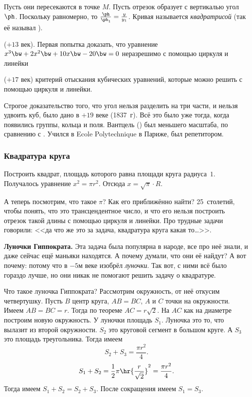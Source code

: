 \documentclass[a4paper,oneside,fleqn,10pt]{article}
\begin{document}


Пусть они пересекаются в точке $M$.  Пусть отрезок образует с
вертикалью угол $\ph$.  Поскольку равномерно, то $\frac{\ph}{\ph_1} =
\frac{y}{y_1}$.  Кривая называется \emph{квадратрисой} (так её называл
).

 ($+13$ век). Первая попытка доказать, что
уравнение $x^3 \bw+ 2x^2 \bw+ 10x \bw- 20 \bw= 0$ неразрешимо с
помощью циркуля и линейки 

 ($+17$ век) критерий отыскания кубических уравнений,
которые можно решить с помощью циркуля и линейки.

Строгое доказательство того, что угол нельзя разделить на три части, и
нельзя удвоить куб, было дано 
в $+19$ веке (1837~г).  Всё это было уже тогда, когда появились
группы, кольца и поля. Вантцель () был меньшего
масштаба, по сравнению с .  Учился в Ecole
Polytechnique в Париже, был репетитором.

\subsubsection{Квадратура круга}

Построить квадрат, площадь которого равна площади круга радиуса~$1$.
Получалось уравнение $x^2 = \pi r^2$. Отсюда $x = \sqrt\pi \cdot R$.

А теперь посмотрим, что такое $\pi$?  Как его приближённо найти?
25~столетий, чтобы понять, что это трансцендентное число, и что его
нельзя построить отрезок такой длины с помощью циркуля и линейки.  Про
трудные задачи говорили: <<да что же это за задача, квадратура круга
какая то\ldots>>.


\textbf{Луночки Гиппократа.}  Эта задача была популярна в народе, все
про неё знали, и даже сейчас ещё маньяки находятся.  А почему думали,
что они её найдут? А вот почему: потому что 
в $-5$м веке изобрёл \emph{луночки}.  Так вот, с ними всё было гораздо
лучше, но они никак не помогают решить задачу о квадратуре.

Что такое луночка Гиппократа? Рассмотрим окружность, от неё откусим
четвертушку.  Пусть $B$ центр круга, $AB= BC$, $A$ и $C$ точки на
окружности.  Имеем $AB = BC = r$. Тогда по теореме
 $AC = r\sqrt2$.  На $AC$ как на диаметре
построим новую окружность. У луночки площадь $S_1$.  Луночка это то,
что вылазит из второй окружности. $S_2$ это круговой сегмент в большом
круге. А $S_3$ это площадь треугольника. Тогда имеем
$$S_2 + S_3 = \frac{\pi r^2}{4}.$$ 
$$S_1 + S_2 = \frac12 \pi \hr{\frac{r}{\sqrt2}}^2 = \frac{\pi
  r^2}{4}.$$ Тогда имеем $S_1 + S_2 = S_2 + S_3$. После сокращения
имеем $S_1 = S_3$.
\end{document}
